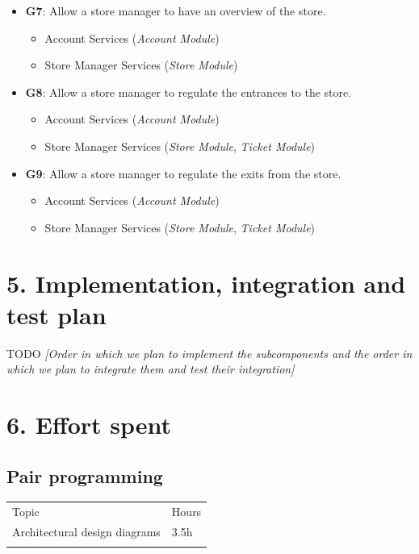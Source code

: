 \begin{itemize}
\begin{itemize}
    \end{itemize}
\item \textbf{G7}: Allow a store manager to have an overview of the store.
    \begin{itemize}
        \item Account Services (\emph{Account Module})
        \item Store Manager Services (\emph{Store Module})
    \end{itemize}
\item \textbf{G8}: Allow a store manager to regulate the entrances to the store.
    \begin{itemize}
        \item Account Services (\emph{Account Module})
        \item Store Manager Services (\emph{Store Module}, \emph{Ticket Module})
    \end{itemize}
\item \textbf{G9}: Allow a store manager to regulate the exits from the store.
    \begin{itemize}
        \item Account Services (\emph{Account Module})
        \item Store Manager Services (\emph{Store Module}, \emph{Ticket Module})
    \end{itemize}
\end{itemize}

\chapter{5. Implementation, integration and test plan}

TODO \emph{[Order in which we plan to implement the subcomponents and the order in which we plan to integrate them and test their integration]}

\chapter{6. Effort spent}

\section{Pair programming}

\begin{longtable}[]{@{}
  >{\raggedright\arraybackslash}p{}
  >{\raggedleft\arraybackslash}p{}@{}}
\toprule
Topic & Hours \\ \addlinespace
\midrule
\endhead
Architectural design diagrams & 3.5h \\ \addlinespace
\bottomrule
\end{longtable}

